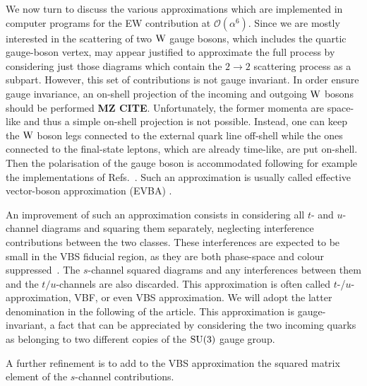 We now turn to discuss the various approximations which are implemented in computer programs for the EW contribution at
$\mathcal{O}{\left(\alpha^{6}\right)}$. Since we are mostly interested in 
the scattering of two $\text{W}$ gauge bosons, which includes the quartic gauge-boson vertex, may appear justified to approximate the 
full process by considering just those diagrams which contain the $2\rightarrow 2$ scattering process as a subpart.
However, this set of contributions is not gauge invariant.
In order ensure gauge invariance, an on-shell projection of the incoming and outgoing $\text{W}$ bosons should be performed {\bf MZ CITE}.
Unfortunately, the former momenta are space-like and thus a simple on-shell projection is not possible.
Instead, one can keep the $\text{W}$ boson legs connected to the external quark line off-shell while the ones connected 
to the final-state leptons, which are already time-like, are put on-shell. 
Then the polarisation of the gauge boson is accommodated following for example the implementations of Refs.~\cite{Kuss:1995yv,Accomando:2006hq}.
Such an approximation is usually called effective vector-boson approximation (EVBA) \cite{Dawson:1984gx,Duncan:1985vj,Cahn:1983ip}.

An improvement of such an approximation consists 
in considering all $t$- and $u$-channel diagrams and squaring them separately, neglecting interference contributions between the two classes.
These interferences are expected to be small in the VBS fiducial region, as they are both phase-space and colour suppressed~\cite{Oleari:2003tc}.
The $s$-channel squared diagrams and any interferences between them and the  $t/u$-channels are also discarded.
This approximation is often called $t$-/$u$- approximation, VBF, or even VBS approximation.
We will adopt the latter denomination in the following of the article.
This approximation is gauge-invariant, a fact that can be appreciated by considering the two incoming quarks as belonging to two different copies of the $\rm{SU}(3)$ gauge group.

A further refinement is to add to the VBS approximation the squared matrix element of the $s$-channel contributions.

